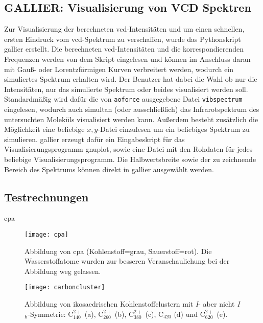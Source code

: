 	\subsection{GALLIER: Visualisierung von VCD Spektren}
	Zur Visualisierung der berechneten \ac{vcd}-Intensitäten und um einen schnellen, ersten Eindruck vom \ac{vcd}-Spektrum zu verschaffen, wurde das Pythonskript \ac{gallier} erstellt. Die berechneten \ac{vcd}-Intensitäten und die korrespondierenden Frequenzen werden von dem Skript eingelesen und können im Anschluss daran mit Gauß- oder Lorentzförmigen Kurven verbreitert werden, wodurch ein simuliertes Spektrum erhalten wird. Der Benutzer hat dabei die Wahl ob nur die Intensitäten, nur das simulierte Spektrum oder beides visualisiert werden soll. Standardmäßig wird dafür die von \texttt{aoforce} ausgegebene Datei \texttt{vibspectrum} eingelesen, wodurch auch simultan (oder ausschließlich) das Infrarotspektrum des untersuchten Moleküls visualisiert werden kann. Außerdem besteht zusätzlich die Möglichkeit eine beliebige $x,y$-Datei einzulesen um ein beliebiges Spektrum zu simulieren. \ac{gallier} erzeugt dafür ein Eingabeskript für das Visualisierungsprogramm gnuplot\supercite{gnuplot}, sowie eine Datei mit den Rohdaten für jedes beliebige Visualisierungsprogramm. Die Halbwertsbreite sowie der zu zeichnende Bereich des Spektrums können direkt in \ac{gallier} ausgewählt werden.
	\subsection{Testrechnungen}
	\ac{cpa}
\begin{figure}[ht!]
	\centering
	\texttt{[image: cpa]}
	\captionsetup{figurewithin = chapter}
	\captionsetup{font=small, labelfont=bf}\caption[Abbildung von \ac{cpa}]{Abbildung von \ac{cpa} (Kohlenstoff=grau, Sauerstoff=rot). Die Wasserstoffatome wurden zur besseren Veranschaulichung bei der Abbildung weg gelassen.}
\label{abb:cpa}
\end{figure}

\begin{figure}[ht!]
	\centering
	\texttt{[image: carboncluster]}
	\captionsetup{figurewithin = chapter}
	\captionsetup{font=small, labelfont=bf}\caption[Abbildung von ikosaedrischen Kohlenstoffclustern]{Abbildung von ikosaedrischen Kohlenstoffclustern mit \textit{I}- aber nicht \textit{I}$_\textrm{h}$-Symmetrie: C$^{2+}_{140}$ (a), C$^{2+}_{260}$ (b), C$^{2+}_{380}$ (c), C$_{420}$ (d) und C$^{2+}_{620}$ (e).}
\label{abb:carboncluster}
\end{figure}
	
